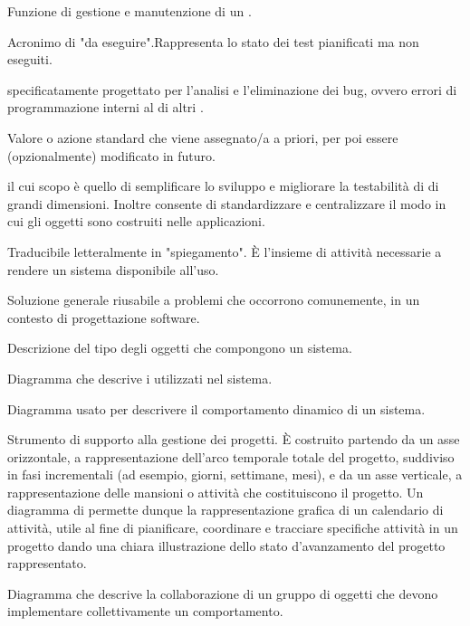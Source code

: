 {Funzione di gestione e manutenzione di un .}

{Acronimo di "da eseguire".Rappresenta lo stato dei test pianificati ma non eseguiti.}

{ specificatamente progettato per l'analisi e l'eliminazione dei bug, ovvero errori di programmazione interni al  di altri .}

{Valore o azione standard che viene assegnato/a a priori, per poi essere (opzionalmente) modificato in futuro.}

{ il cui scopo è quello di semplificare lo sviluppo e migliorare la testabilità di  di grandi dimensioni. Inoltre consente di standardizzare e centralizzare il modo in cui gli oggetti sono costruiti nelle applicazioni.}
 
{Traducibile letteralmente in "spiegamento". \`{E} l'insieme di attività necessarie a rendere un sistema  disponibile all'uso.}

{Soluzione generale riusabile a problemi che occorrono comunemente, in un contesto di progettazione software.}

{Descrizione del tipo degli oggetti che compongono un sistema.}

{Diagramma che descrive i  utilizzati nel sistema.}

{Diagramma  usato per descrivere il comportamento dinamico di un sistema.}

{Strumento di supporto alla gestione dei progetti. \`{E} costruito partendo da un asse orizzontale, a rappresentazione dell'arco temporale totale del progetto, suddiviso in fasi incrementali (ad esempio, giorni, settimane, mesi), e da un asse verticale, a rappresentazione delle mansioni o attività che costituiscono il progetto. Un diagramma di  permette dunque la rappresentazione grafica di un calendario di attività, utile al fine di pianificare, coordinare e tracciare specifiche attività in un progetto dando una chiara illustrazione dello stato d'avanzamento del progetto rappresentato.} 

{Diagramma che descrive la collaborazione di un gruppo di oggetti che devono implementare collettivamente un comportamento.}

